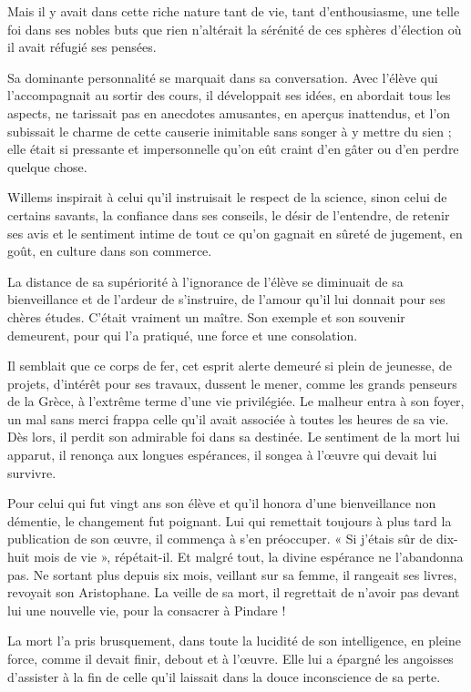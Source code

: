 \documentclass{book}%
\begin{document}
Mais il y avait dans cette riche nature tant de vie, tant d'enthousiasme, une telle foi dans ses nobles buts que rien n'altérait la sérénité de ces sphères d'élection où il avait réfugié ses pensées. 

Sa dominante personnalité se marquait dans sa conversation. Avec l'élève qui l'accompagnait au sortir des cours, il développait ses idées, en abordait tous les aspects, ne tarissait pas en anecdotes amusantes, en aperçus inattendus, et l'on subissait le charme de cette causerie inimitable sans songer à y mettre du sien ; elle était si pressante et impersonnelle qu'on eût craint d'en gâter ou d'en perdre quelque chose. 

Willems inspirait à celui qu'il instruisait le respect de la science, sinon celui de certains savants, la confiance dans ses conseils, le désir de l'entendre, de retenir ses avis et le sentiment intime de tout ce qu'on gagnait en sûreté de jugement, en goût, en culture dans son commerce. 

La distance de sa supériorité à l'ignorance de l'élève se diminuait de sa bienveillance et de l'ardeur de s'instruire, de l'amour qu'il lui donnait pour ses chères études. 
C'était vraiment un maître. Son exemple et son souvenir demeurent, pour qui l'a pratiqué, une force et une consolation. 

Il semblait que ce corps de fer, cet esprit alerte demeuré si plein de jeunesse, de projets, d'intérêt pour ses travaux, dussent le mener, comme les grands penseurs de la Grèce, à l'extrême terme d'une vie privilégiée. Le malheur entra à son foyer, un mal sans merci frappa celle qu'il avait associée à toutes les heures de sa vie. Dès lors, il perdit son admirable foi dans sa destinée. 
Le sentiment de la mort lui apparut, il renonça aux longues espérances, il songea à l'œuvre qui devait lui survivre. 

Pour celui qui fut vingt ans son élève et qu'il honora d'une bienveillance non démentie, le changement fut poignant. 
Lui qui remettait toujours à plus tard la publication de son œuvre, il commença à s'en préoccuper. « Si j'étais sûr de dix-huit mois de vie », répétait-il. Et malgré tout, la divine espérance ne l'abandonna pas. Ne sortant plus depuis six mois, veillant sur sa femme, il rangeait ses livres, revoyait son Aristophane. La veille de sa mort, il regrettait de n'avoir pas devant lui une nouvelle vie, pour la consacrer à Pindare ! 

La mort l'a pris brusquement, dans toute la lucidité de son intelligence, en pleine force, comme il devait finir, debout et à l'œuvre. Elle lui a épargné les angoisses d'assister à la fin de celle qu'il laissait dans la douce inconscience de sa perte.
\end{document}
